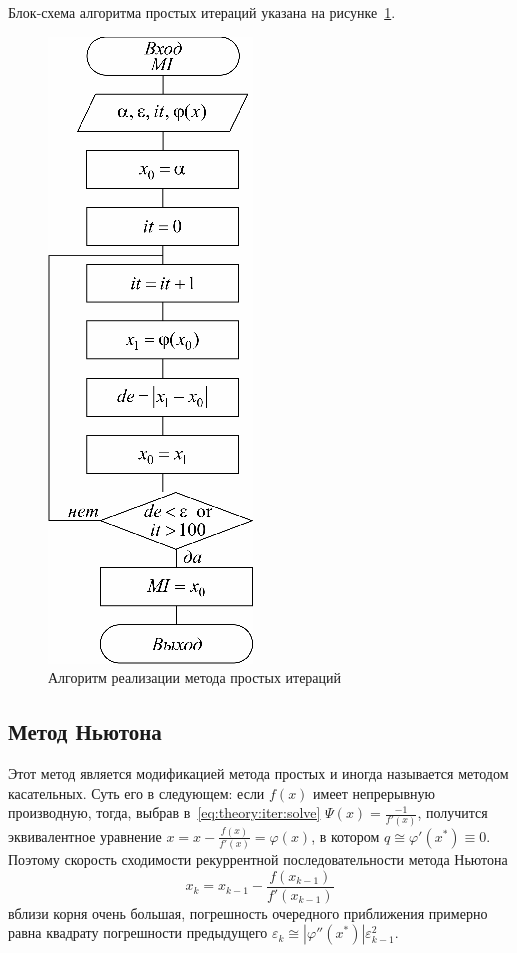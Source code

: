Блок-схема алгоритма простых итераций указана на рисунке~\ref{fig:theory:iter:algo}.
\begin{figure}[ht]
	\centering
	\includegraphics{attachments/theory_simple_iterations_algo}
	\caption{Алгоритм реализации метода простых итераций}
	\label{fig:theory:iter:algo}
\end{figure}

\subsection{Метод Ньютона}
Этот метод является модификацией метода простых и иногда называется методом касательных. Суть его в следующем: если $f(x)$ имеет непрерывную производную, тогда, выбрав в~\ref{eq:theory:iter:solve} $\Psi(x) = \frac{-1}{f'(x)}$, получится эквивалентное уравнение $x=x-\frac{f(x)}{f'(x)}=\varphi(x)$, в котором $q\cong \varphi'(x^*)\equiv 0$. Поэтому скорость сходимости рекуррентной последовательности метода Ньютона
\begin{equation}
	x_k=x_{k-1} -\frac{f(x_{k-1})}{f'(x_{k-1})}
	\label{eq:theory:newton:speed}
\end{equation}
вблизи корня очень большая, погрешность очередного приближения примерно равна квадрату погрешности предыдущего $\varepsilon_k \cong \left|\varphi''(x^*)\right| \varepsilon_{k-1}^2$.

